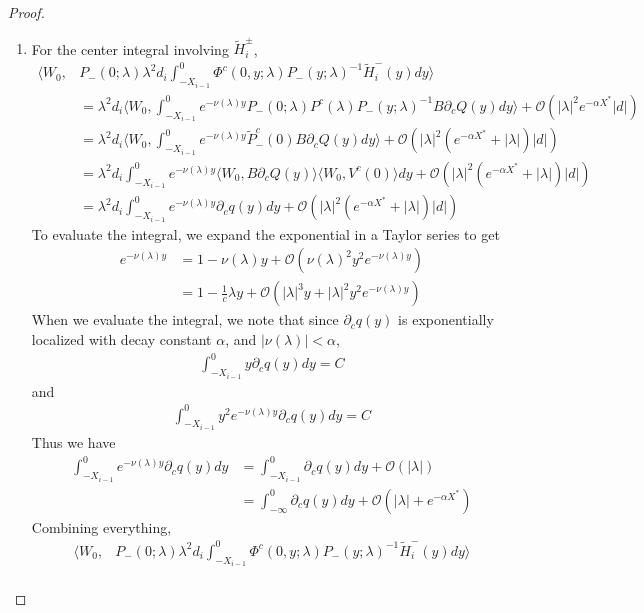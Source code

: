 \documentclass[thesis.tex]{subfiles}
\begin{document}
\begin{lemma}
\begin{proof}
\begin{enumerate}
\item For the center integral involving $\tilde{H}_i^\pm$, 
\begin{align*}
\langle W_0, &P_-(0; \lambda) \lambda^2 d_i \int_{-X_{i-1}}^0 \Phi^c(0, y; \lambda) P_-(y; \lambda)^{-1} \tilde{H}_i^-(y) dy \rangle \\
&= \lambda^2 d_i  \langle W_0, \int_{-X_{i-1}}^0 e^{-\nu(\lambda) y} P_-(0; \lambda) P^c(\lambda) P_-(y; \lambda)^{-1} B \partial_c Q(y) dy \rangle  + \mathcal{O}(|\lambda|^2 e^{-\alpha X^*} |d|) \\
&= \lambda^2 d_i  \langle W_0, \int_{-X_{i-1}}^0 e^{-\nu(\lambda) y} \tilde{P}^c_-(0) B \partial_c Q(y) dy \rangle + \mathcal{O}(|\lambda|^2( e^{-\alpha X^*} + |\lambda|) |d|)\\
&= \lambda^2 d_i  \int_{-X_{i-1}}^0 e^{-\nu(\lambda) y} \langle W_0, B \partial_c Q(y) \rangle \langle W_0, V^c(0) \rangle dy + \mathcal{O}(|\lambda|^2( e^{-\alpha X^*} + |\lambda|) |d|) \\
&= \lambda^2 d_i \int_{-X_{i-1}}^0 e^{-\nu(\lambda) y} \partial_c q(y) dy + \mathcal{O}(|\lambda|^2( e^{-\alpha X^*} + |\lambda|) |d|)
\end{align*}
To evaluate the integral, we expand the exponential in a Taylor series to get
\begin{align*}
e^{-\nu(\lambda)y} 
&= 1 - \nu(\lambda)y + \mathcal{O}( \nu(\lambda)^2 y^2 e^{-\nu(\lambda)y} ) \\
&= 1 - \frac{1}{c}\lambda y + \mathcal{O}(|\lambda|^3 y + |\lambda|^2 y^2 e^{-\nu(\lambda)y})
\end{align*}
When we evaluate the integral, we note that since $\partial_c q(y)$ is exponentially localized with decay constant $\alpha$, and $|\nu(\lambda)| < \alpha$,
\begin{align*}
\int_{-X_{i-1}}^0 y \partial_c q(y) dy = C
\end{align*}
and
\begin{align*}
\int_{-X_{i-1}}^0 y^2 e^{-\nu(\lambda)y}\partial_c q(y) dy = C
\end{align*}
Thus we have
\begin{align*}
\int_{-X_{i-1}}^0 e^{-\nu(\lambda) y} \partial_c q(y) dy &= \int_{-X_{i-1}}^0 \partial_c q(y)dy + \mathcal{O}(|\lambda|) \\
&= \int_{-\infty}^0 \partial_c q(y)dy + \mathcal{O}(|\lambda| + e^{-\alpha X^*}) 
\end{align*}
Combining everything,
\begin{align*}
\langle W_0, &P_-(0; \lambda) \lambda^2 d_i \int_{-X_{i-1}}^0 \Phi^c(0, y; \lambda) P_-(y; \lambda)^{-1} \tilde{H}_i^-(y) dy \rangle \\

\end{align*}
\end{enumerate}
\end{proof}
\end{lemma}
\end{document}
